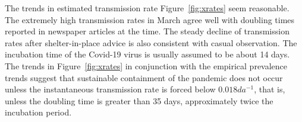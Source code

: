 \documentclass[12pt,letterpaper]{article}
\newcommand\help[1]{\color{Magenta}{\it #1 }\normalcolor}
\begin{document}
The trends in estimated transmission rate Figure~\ref{fig:xrates} seem
reasonable. The extremely high transmission rates in March agree well
with doubling times reported in newspaper articles at the time.
The steady decline of transmission rates after shelter-in-place advice is 
also consistent with casual observation.
The incubation time of the Covid-19 virus is usually assumed to be
about 14 days.
The trends in Figure~\ref{fig:xrates} in conjunction with the
empirical prevalence trends suggest that sustainable containment of
the pandemic does not occur unless the instantaneous transmission rate
is forced below $0.018 da^{-1}$, that is, unless the doubling time is greater
than 35 days, approximately twice the incubation period.

\help{
Upward bump in transmission rates consistent with observed increases
in cases in July.


Omit:
Whether the available data are sufficiently informative to enable
estimation of the model parameters is a critical aspect of the
evaluation of any statistical model.
The speed at which the Covid-19 pandemic spread during the first
quarter of
2020 means that the length of the time series doubled during
the development of this model. The capability of the
model improve conveniently during the model development period,
but whether the improvement is
attributable to changes in model structure or to the increase in the
length of the time series is unclear. This ambiguity influenced the
development of the model.}

\cite{Sibert2017,Nielsen2014b}


\clearpage
\end{document}

